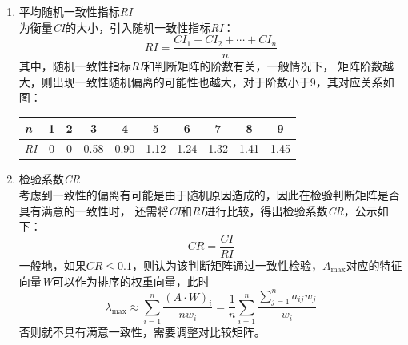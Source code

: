 \documentclass[a4paper, 12pt]{article}
\numberwithin{equation}{section}
\begin{document}
\begin{enumerate}
\begin{enumerate}
                                \item 平均随机一致性指标\textit{RI} \\
                                    为衡量\textit{CI}的大小，引入随机一致性指标\textit{RI}：
                                    \begin{equation}
                                        RI = \frac{CI_{1} + CI_{2} + \cdots + CI_{n}}{n}
                                    \end{equation}
                                    其中，随机一致性指标\textit{RI}和判断矩阵的阶数有关，一般情况下，
                                    矩阵阶数越大，则出现一致性随机偏离的可能性也越大，对于阶数小于9，其对应关系如图：
                                    \begin{table}[h]
                                        \centering
                                        \begin{tabular}{l|c c c c c c c c c} \hline
                                            \textit{n} & 1 & 2 & 3 & 4 & 5 & 6 & 7 & 8 & 9 \\ \hline
                                            \textit{RI} & 0 & 0 & 0.58 & 0.90 & 1.12 & 1.24 & 1.32 & 1.41 & 1.45 \\ \hline
                                        \end{tabular}
                                    \end{table}

                                \item 检验系数\textit{CR} \\
                                    考虑到一致性的偏离有可能是由于随机原因造成的，因此在检验判断矩阵是否具有满意的一致性时，
                                    还需将\textit{CI}和\textit{RI}进行比较，得出检验系数\textit{CR}，公示如下：
                                    \begin{equation}
                                        CR = \frac{CI}{RI}
                                    \end{equation}
                                    一般地，如果$ CR \le 0.1 $，则认为该判断矩阵通过一致性检验，$ A_{\max} $对应的特征向量\textit{W}可以作为排序的权重向量，此时
                                    \begin{equation}
                                        \lambda _{\max} \approx \sum_{i=1}^{n} \frac{(A \cdot W)_{i}}{nw_{i}} = \frac{1}{n} \sum_{i=1}^{n} \frac{\sum_{j=1}^{n} a_{ij}w_{j}}{w_{i}}
                                    \end{equation}
                                    否则就不具有满意一致性，需要调整对比较矩阵。
                            \end{enumerate}
                    \end{enumerate}
\end{document}
